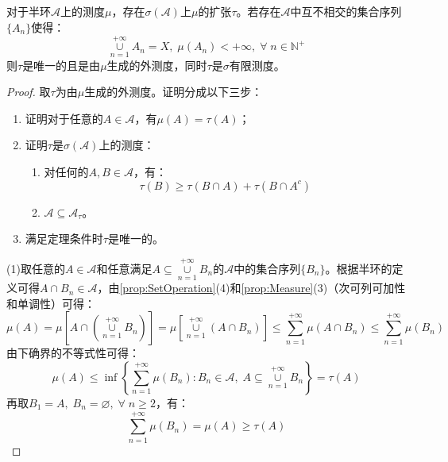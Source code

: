 \begin{theorem}\label{theo:SemiringMeasureExtension}
	对于半环$\mathscr{A}$上的测度$\mu$，存在$\sigma(\mathscr{A})$上$\mu$的扩张$\tau$。若存在$\mathscr{A}$中互不相交的集合序列$\{A_n\}$使得：
	\begin{equation*}
		\underset{n=1}{\overset{+\infty}{\cup}}A_n=X,\;\mu(A_n)<+\infty,\;\forall\;n\in\mathbb{N}^+
	\end{equation*}
	则$\tau$是唯一的且是由$\mu$生成的外测度，同时$\tau$是$\sigma$有限测度。
\end{theorem}
\begin{proof}
	取$\tau$为由$\mu$生成的外测度。证明分成以下三步：
	\begin{enumerate}
		\item 证明对于任意的$A\in\mathscr{A}$，有$\mu(A)=\tau(A)$；
		\item 证明$\tau$是$\sigma(\mathscr{A})$上的测度：
		\begin{enumerate}
			\item 对任何的$A,B\in\mathscr{A}$，有：
			\begin{equation*}
				\tau(B)\geqslant\tau(B\cap A)+\tau(B\cap A^c)
			\end{equation*}
			\item $\mathscr{A}\subseteq\mathscr{A}_{\tau}$。
		\end{enumerate}
		\item 满足定理条件时$\tau$是唯一的。
	\end{enumerate}\par
	(1)取任意的$A\in\mathscr{A}$和任意满足$A\subseteq\underset{n=1}{\overset{+\infty}{\cup}}B_n$的$\mathscr{A}$中的集合序列$\{B_n\}$。根据半环的定义可得$A\cap B_n\in\mathscr{A}$，由\cref{prop:SetOperation}(4)和\cref{prop:Measure}(3)（次可列可加性和单调性）可得：
	\begin{equation*}
		\mu(A)=\mu\left[A\cap\left(\underset{n=1}{\overset{+\infty}{\cup}}B_n\right)\right]=\mu\left[\underset{n=1}{\overset{+\infty}{\cup}}(A\cap B_n)\right]\leqslant\sum_{n=1}^{+\infty}\mu(A\cap B_n)\leqslant\sum_{n=1}^{+\infty}\mu(B_n)
	\end{equation*}
	由下确界的不等式性可得：
	\begin{equation*}
		\mu(A)\leqslant\inf\left\{\sum_{n=1}^{+\infty}\mu(B_n):B_n\in\mathscr{A},\;A\subseteq\underset{n=1}{\overset{+\infty}{\cup}}B_n\right\}=\tau(A)
	\end{equation*}
	再取$B_1=A,\;B_n=\varnothing,\;\forall\;n\geqslant2$，有：
	\begin{equation*}
		\sum_{n=1}^{+\infty}\mu(B_n)=\mu(A)\geqslant\tau(A)

\end{equation*}
\end{proof}
